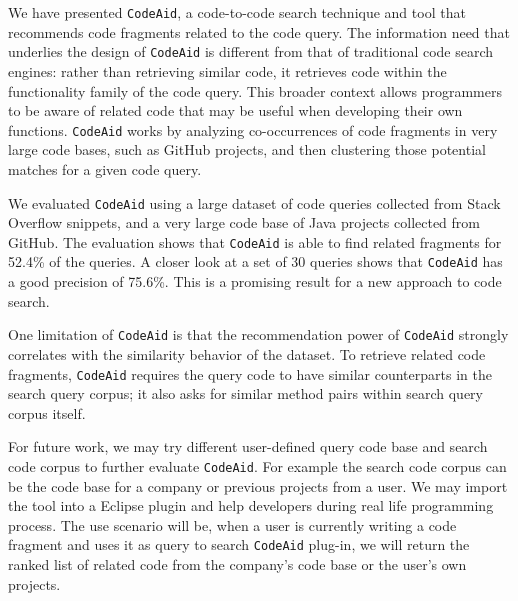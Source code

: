 \documentclass[conference]{IEEEtran}
\newcommand{\ttt}[1]{\tt\small{#1}}
\newcommand{\tool}{{\ttt CodeAid}}
\begin{document}
We have presented {\tool}, a code-to-code search technique and tool
that recommends code fragments related to the code query. The
information need that underlies the design of {\tool} is different
from that of traditional code search engines: rather than retrieving
similar code, it retrieves code within the functionality family of the
code query. This broader context allows programmers to be aware of
related code that may be useful when developing their own
functions. {\tool} works by analyzing co-occurrences of code fragments
in very large code bases, such as GitHub projects, and then clustering
those potential matches for a given code query.

We evaluated {\tool} using a large dataset of code queries collected
from Stack Overflow snippets, and a very large code base of Java
projects collected from GitHub. The evaluation shows that {\tool} is
able to find related fragments for 52.4\% of the queries. A closer look at a set of 30
queries shows that {\tool} has a good precision of 75.6\%. This is
a promising result for a new approach to code search. 

One limitation of {\tool} is that the recommendation power of {\tool} strongly correlates with the similarity behavior of the dataset. To retrieve related code fragments, {\tool} requires the query code to have similar counterparts in the search query corpus; it also asks for similar method pairs within search query corpus itself. 

For future work, we may try different user-defined query code base and search code corpus to further evaluate {\tool}. For example the search code corpus can be the code base for a company or previous projects from a user. We may import the tool into a Eclipse plugin and help developers during real life programming process. The use scenario will be, when a user is currently writing a code fragment and uses it as query to search {\tool} plug-in, we will return the ranked list of related code from the company's code base or the user's own projects.





\end{document}
